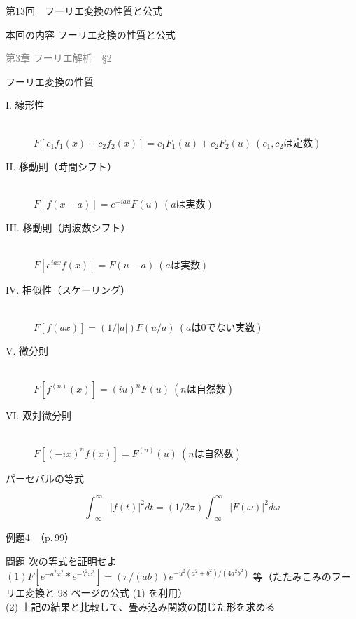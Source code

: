 \documentclass[professionalfonts]{beamer}
\begin{document}
\begin{frame}{第13回　フーリエ変換の性質と公式}
  \begin{block}{本回の内容}
  フーリエ変換の性質と公式
  \end{block}
  \vfill\hfill{\scriptsize \textcolor{gray}{第3章 フーリエ解析　§2}}
\end{frame}

\begin{frame}{フーリエ変換の性質}
  \begin{block}{}
  \begin{description}
    \item[I. 線形性]\mbox{}\\$F[c_{1}f_{1}(x) + c_{2}f_{2}(x)] = c_{1}F_{1}(u) + c_{2}F_{2}(u) \ (c_{1}, c_{2} は定数)$
    \item[II. 移動則（時間シフト）]\mbox{}\\$F[f(x-a)] = e^{-iau} F(u) \ (a は実数)$
    \item[III. 移動則（周波数シフト）]\mbox{}\\$F[e^{iax}f(x)] = F(u-a) \ (a は実数)$
    \item[IV. 相似性（スケーリング）]\mbox{}\\$F[f(ax)] = (1/|a|) F(u/a) \ (a は 0 でない実数)$
    \item[V. 微分則]\mbox{}\\$F[f^{(n)}(x)] = (iu)^n F(u) \ (n は自然数)$
    \item[VI. 双対微分則]\mbox{}\\$F[(-ix)^n f(x)] = F^{(n)}(u) \ (n は自然数)$
  \end{description}
  \end{block}
\end{frame}

\begin{frame}{パーセバルの等式}
  \begin{block}{}
  \[
    \int_{-\infty}^\infty |f(t)|^{2} dt = (1/2\pi) \int_{-\infty}^\infty |F(\omega)|^{2} d\omega
  \]
  \end{block}
\end{frame}

\begin{frame}{例題4　（p.\,99）}
  \begin{exampleblock}{問題}
    次の等式を証明せよ\\[2pt]
    $(1) F[e^{-a^{2}x^{2}} * e^{-b^{2}x^{2}}] = (\pi/(ab)) e^{-u^{2}(a^{2}+b^{2})/(4a^{2}b^{2})}$ 等（たたみこみのフーリエ変換と 98 ページの公式 (1) を利用）\\[2pt]
    (2) 上記の結果と比較して、畳み込み関数の閉じた形を求める\\[2pt]
  \end{exampleblock}
\end{frame}
\end{document}
